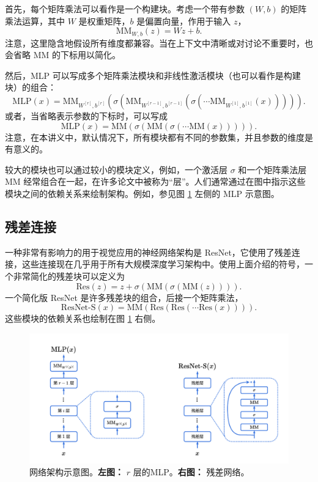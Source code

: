 首先，每个矩阵乘法可以看作是一个构建块。考虑一个带有参数 $(W, b)$ 的矩阵乘法运算，其中 $W$ 是权重矩阵，$b$ 是偏置向量，作用于输入 $z$，
\begin{equation}
    \text{MM}_{W,b}(z) = W z + b. \label{eq:7.35}
\end{equation}
注意，这里隐含地假设所有维度都兼容。当在上下文中清晰或对讨论不重要时，也会省略 MM 的下标用以简化。

然后，MLP 可以写成多个矩阵乘法模块和非线性激活模块（也可以看作是构建块）的组合：
\begin{equation}
    \text{MLP}(x) = \text{MM}_{W^{[r]}, b^{[r]}} (\sigma(\text{MM}_{W^{[r-1]}, b^{[r-1]}} (\sigma(\cdots \text{MM}_{W^{[1]}, b^{[1]}}(x))))). \label{eq:7.36}
\end{equation}
或者，当省略表示参数的下标时，可以写成
\begin{equation}
    \text{MLP}(x) = \text{MM}(\sigma(\text{MM}(\sigma(\cdots \text{MM}(x))))). \label{eq:7.37}
\end{equation}
注意，在本讲义中，默认情况下，所有模块都有不同的参数集，并且参数的维度是有意义的。

较大的模块也可以通过较小的模块定义，例如，一个激活层 $\sigma$ 和一个矩阵乘法层 MM 经常组合在一起，在许多论文中被称为“层”。人们通常通过在图中指示这些模块之间的依赖关系来绘制架构。例如，参见图 \ref{fig:7.4} 左侧的 MLP 示意图。

\subsection*{残差连接}

一种非常有影响力的用于视觉应用的神经网络架构是 ResNet，它使用了残差连接，这些连接现在几乎用于所有大规模深度学习架构中。使用上面介绍的符号，一个非常简化的残差块可以定义为
\begin{equation}
    \text{Res}(z) = z + \sigma(\text{MM}(\sigma(\text{MM}(z)))). \label{eq:7.38}
\end{equation}
一个简化版 ResNet 是许多残差块的组合，后接一个矩阵乘法，
\begin{equation}
    \text{ResNet-S}(x) = \text{MM}(\text{Res}(\text{Res}(\cdots \text{Res}(x)))). \label{eq:7.39}
\end{equation}
这些模块的依赖关系也绘制在图 \ref{fig:7.4} 右侧。

\begin{figure}[H]
    \centering
    \includegraphics[width=1.0\linewidth]{figs/nn_architecture.pdf}
    \caption{网络架构示意图。\textbf{左图：} $r$ 层的MLP。\textbf{右图：} 残差网络。}
    \label{fig:7.4}
\end{figure}

